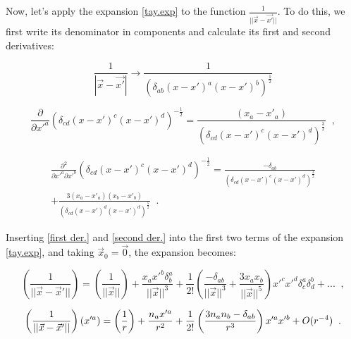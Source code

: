 

Now, let's apply the expansion \ref{tay.exp} to the function $\frac{1}{||\vec{x}-\vec{x'}||}$. To do this, we first write its denominator in components and calculate its first and second derivatives:

$$ \frac{1}{|\vec{x}-\vec{x'}|} \rightarrow \frac{1}{(\delta_{ab} (x- x')^a (x- x')^b)^\frac{1}{2}}$$

\begin{equation}\label{first der.}
\frac{\partial}{\partial x'^a}(\delta_{cd} (x- x')^c (x- x')^d)^{-\frac{1}{2}} = \frac{(x_a - x'_a)}{(\delta_{cd} (x- x')^c (x- x')^d)^{\frac{3}{2}}} \;\; ,
\end{equation}

\begin{multline}\label{second der.}
\frac{\partial^2}{\partial x'^a \partial x'^b}(\delta_{cd} (x- x')^c (x- x')^d)^{-\frac{1}{2}} = \frac{-\delta_{ab}}{(\delta_{cd} (x- x')^c (x- x')^d)^{\frac{3}{2}}}\\ +\frac{3(x_a - x'_a)(x_b - x'_b)}{ (\delta_{cd} (x- x')^d (x- x')^d)^{\frac{5}{2}} } \;\; .
\end{multline}


Inserting \ref{first der.} and \ref{second der.} into the first two terms of the expansion \ref{tay.exp}, and taking $\vec{x}_0 = \vec{0}$, the expansion becomes: 

\begin{equation}
\left( \frac{1}{|| \vec{x} - \vec{x}'||} \right) = \left( \frac{1}{|| \vec{x}||} \right) + \frac{x_a x'^b \delta^a_b}{||\vec{x}||^3} + \frac{1}{2!} \left(\frac{-\delta_{ab}}{||\vec{x}||^3} + \frac{3 x_a x_b}{||\vec{x}||^5}  \right) x'^c x'^d \delta^a_c \delta^b_d +  ... \;\; ,
\end{equation}


\begin{equation}
\left( \frac{1}{|| \vec{x} - \vec{x}'||} \right)(x'^a) = \left( \frac{1}{r} \right) + \frac{n_a x'^a}{r^2} + \\ \frac{1}{2!} \left(\frac{ 3 n_a n_b -\delta_{ab}}{r^3}  \right) x'^a x'^b + O(r^{-4})\;\; .
\end{equation}



